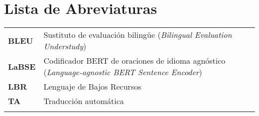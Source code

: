 \chapter*{Lista de Abreviaturas}

\renewcommand{\arraystretch}{1.5}
\begin{tabular}{@{}p{2cm}p{10cm}}
    \textbf{BLEU} & Sustituto de evaluación bilingüe (\textit{Bilingual Evaluation Understudy}) \\
    \textbf{LaBSE}  & Codificador BERT de oraciones de idioma agnóstico (\textit{Language-agnostic BERT Sentence Encoder}) \\
    \bf{LBR} & Lenguaje de Bajos Recursos \\
    \bf{TA} & Traducción automática\\
    \bf{} & \\
\end{tabular}